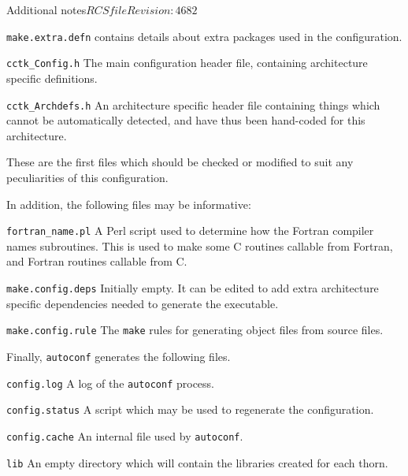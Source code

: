 \begin{cactuspart}{Additional notes}{$RCSfile$}{$Revision: 4682 $}
\begin{Lentry}
\begin{Lentry}
\item [\texttt{make.extra.defn}]
contains details about extra packages used in the configuration.

\item [\texttt{cctk\_Config.h}]
The main configuration header file, containing architecture specific
definitions.

\item [\texttt{cctk\_Archdefs.h}]
An architecture specific header file containing things which cannot be
automatically detected, and have thus been hand-coded for this architecture.
\end{Lentry}

These are the first files which should be checked or modified to suit any
peculiarities of this configuration.

In addition, the following files may be informative:

\begin{Lentry}
\item [\texttt{fortran\_name.pl}]
A Perl script used to determine how the Fortran compiler names subroutines.
This is used to make some C routines callable from Fortran, and Fortran
routines callable from C.

\item [\texttt{make.config.deps}]
Initially empty.  It can be edited to add extra architecture specific dependencies
needed to generate the executable.

\item [\texttt{make.config.rule}]
The \texttt{make} rules for generating object files from source files.

\end{Lentry}

Finally, \texttt{autoconf} generates the following files.

\begin{Lentry}

\item [\texttt{config.log}]
A log of the \texttt{autoconf} process.

\item [\texttt{config.status}]
A script which may be used to regenerate the configuration.

\item [\texttt{config.cache}]
An internal file used by \texttt{autoconf}.

\end{Lentry}

\item [\texttt{lib}]
An empty directory which will contain the libraries created for each thorn.


\end{Lentry}
\end{cactuspart}

